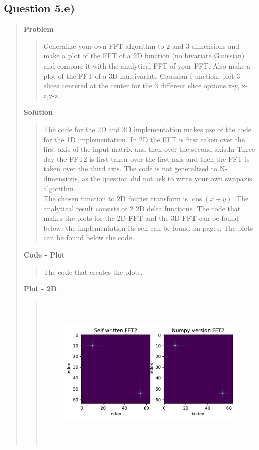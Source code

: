 
\subsection*{\textbf{Question 5.e)}}
\begin{quote}

\textbf{Problem}
\begin{quote}
Generalize your own FFT algorithm to 2 and 3 dimensions and make a plot of the FFT of a 2D function (no bivariate Gaussian) and compare it with the analytical FFT of your FFT. Also make a plot of the FFT of a 3D multivariate Gaussian f unction, plot 3 slices centered at the center for the 3 different slice options x-y, x-z,y-z.
\end{quote}

\textbf{Solution} 
\begin{quote}

The code for the 2D and 3D implementation makes use of the code for the 1D implementation. In 2D the FFT is first taken over the first axis of the input matrix and then over the second axis.In Three day the FFT2 is first taken over the first axis and then the FFT is taken over the third axis. 
The code is not generalized to N-dimensions, as the question did not ask to write your own swapaxis algorithm. 
\\
The chosen function to 2D fourier transform is $\cos(x+y)$. The analytical result consists of 2 2D delta functions. The code that makes the plots for the 2D FFT and the 3D FFT can be found below, the implementation its self can be found on pages. The plots can be found below the code.
\end{quote}
\newpage

\textbf{Code - Plot}
\begin{quote}
The code that creates the plots.

\end{quote}

\textbf{Plot - 2D}\\
\begin{quote}

\begin{figure}[!ht]
\centering
\includegraphics[width=15cm, height=7.5cm]{./Plots/5e_2d_fft.pdf}


\end{figure}
\end{quote}
\end{quote}
